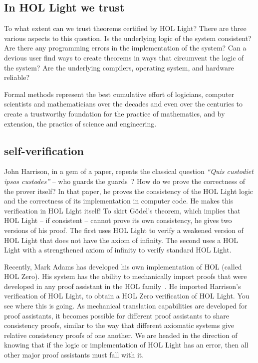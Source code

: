 \documentclass{llncs}
\begin{document}
 

\subsection{In HOL Light we trust}

To what extent can we trust theorems certified by HOL Light?  There
are three various aspects to this question.  Is the underlying logic
of the system consistent?  Are there any programming errors in the
implementation of the system?  Can a devious user find ways to create
theorems in ways that circumvent the logic of the system?  Are the
underlying compilers, operating system, and hardware reliable?

Formal methods represent the best cumulative effort of
logicians, computer scientists and mathematicians over the decades and
even over the centuries to create a trustworthy foundation for the
practice of mathematics, and by extension, the practics of science and
engineering.  

\subsection{self-verification}

John Harrison, in a gem of a paper, repeats the classical question
{\it ``Quis custodiet ipsos custodes''} -- who guards the
guards~\cite{HaSelf}?  How do we prove the correctness of the prover
itself?  In that paper, he proves the consistency of the HOL Light
logic and the correctness of its implementation in computer code.  He
makes this verification in HOL Light itself!  To skirt G\"odel's
theorem, which implies that HOL Light -- if consistent -- cannot prove
its own consistency, he gives two versions of his proof.  The first
uses HOL Light to verify a weakened version of HOL Light that does not
have the axiom of infinity.  The second uses a HOL Light with a
strengthened axiom of infinity to verify standard HOL Light.

Recently, Mark Adams has developed his own implementation of HOL
(called HOL Zero).  His system has the ability to mechanically import
proofs that were developed in any proof assistant in the HOL
family~\cite{Adams}.  He imported Harrison's verification of HOL
Light, to obtain a HOL Zero verification of HOL Light.  You see where
this is going.  As mechanical translation capabilities are developed
for proof assistants, it becomes possible for different proof
assistants to share consistency proofs, similar to the way that
different axiomatic systems give relative consistency proofs of one
another.  We are headed in the direction of knowing that if the logic
or implementation of HOL Light has an error, then all other major
proof assistants must fall with it.
\end{document}
